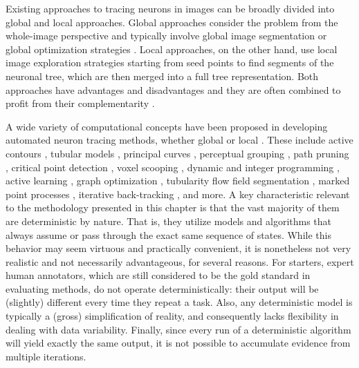 Existing approaches to tracing neurons in images can be broadly divided into global and local approaches. Global approaches consider the problem from the whole-image perspective and typically involve global image segmentation \cite{wearne2005new, basu2013segmentation, de2016graph} or global optimization strategies \cite{turetken2011automated, xiao2013app2}. Local approaches, on the other hand, use local image exploration strategies starting from seed points \cite{peng2011automatic, choromanska2012automatic, yang2013distance} to find segments of the neuronal tree, which are then merged into a full tree representation. Both approaches have advantages and disadvantages and they are often combined to profit from their complementarity \cite{zhao2011automated, jimenez2015improved}.

A wide variety of computational concepts have been proposed in developing automated neuron tracing methods, whether global or local \cite{acciai2016automated}. These include active contours \cite{cai2006repulsive, wang2011broadly, luo2015neuron}, tubular models \cite{santamaria2015automatic}, principal curves \cite{bas2011principal, quan2016neurogps}, perceptual grouping \cite{narayanaswamy20113}, path pruning \cite{peng2011automatic, xiao2013app2}, critical point detection \cite{al2008improved, radojevic2016fuzzy}, voxel scooping \cite{rodriguez2009three}, dynamic and integer programming \cite{zhang2007automated, turetken2012automated}, active learning \cite{gala2014active}, graph optimization \cite{turetken2011automated, chothani2011automated}, tubularity flow field segmentation \cite{mukherjee2015tubularity}, marked point processes \cite{basu2016neurite}, iterative back-tracking \cite{liu2016rivulet}, and more. A key characteristic relevant to the methodology presented in this chapter is that the vast majority of them are deterministic by nature. That is, they utilize models and algorithms that always assume or pass through the exact same sequence of states. While this behavior may seem virtuous and practically convenient, it is nonetheless not very realistic and not necessarily advantageous, for several reasons. For starters, expert human annotators, which are still considered to be the gold standard in evaluating methods, do not operate deterministically: their output will be (slightly) different every time they repeat a task. Also, any deterministic model is typically a (gross) simplification of reality, and consequently lacks flexibility in dealing with data variability. Finally, since every run of a deterministic algorithm will yield exactly the same output, it is not possible to accumulate evidence from multiple iterations. 

